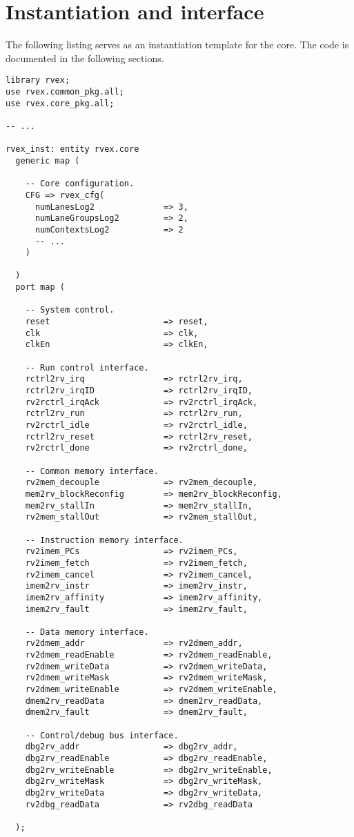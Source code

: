 \documentclass[main.tex]{subfiles}
\begin{document}
\section{Instantiation and interface}

The following listing serves as an instantiation template for the core. The code is documented in the following sections.

\begin{lstlisting}[numbers=none]
library rvex;
use rvex.common_pkg.all;
use rvex.core_pkg.all;

-- ...

rvex_inst: entity rvex.core
  generic map (
    
    -- Core configuration.
    CFG => rvex_cfg(
      numLanesLog2              => 3,
      numLaneGroupsLog2         => 2,
      numContextsLog2           => 2
      -- ...
    )
    
  )
  port map (
    
    -- System control.
    reset                       => reset,
    clk                         => clk,
    clkEn                       => clkEn,
    
    -- Run control interface.
    rctrl2rv_irq                => rctrl2rv_irq,
    rctrl2rv_irqID              => rctrl2rv_irqID,
    rv2rctrl_irqAck             => rv2rctrl_irqAck,
    rctrl2rv_run                => rctrl2rv_run,
    rv2rctrl_idle               => rv2rctrl_idle,
    rctrl2rv_reset              => rctrl2rv_reset,
    rv2rctrl_done               => rv2rctrl_done,
    
    -- Common memory interface.
    rv2mem_decouple             => rv2mem_decouple,
    mem2rv_blockReconfig        => mem2rv_blockReconfig,
    mem2rv_stallIn              => mem2rv_stallIn,
    rv2mem_stallOut             => rv2mem_stallOut,
    
    -- Instruction memory interface.
    rv2imem_PCs                 => rv2imem_PCs,
    rv2imem_fetch               => rv2imem_fetch,
    rv2imem_cancel              => rv2imem_cancel,
    imem2rv_instr               => imem2rv_instr,
    imem2rv_affinity            => imem2rv_affinity,
    imem2rv_fault               => imem2rv_fault,
    
    -- Data memory interface.
    rv2dmem_addr                => rv2dmem_addr,
    rv2dmem_readEnable          => rv2dmem_readEnable,
    rv2dmem_writeData           => rv2dmem_writeData,
    rv2dmem_writeMask           => rv2dmem_writeMask,
    rv2dmem_writeEnable         => rv2dmem_writeEnable,
    dmem2rv_readData            => dmem2rv_readData,
    dmem2rv_fault               => dmem2rv_fault,
    
    -- Control/debug bus interface.
    dbg2rv_addr                 => dbg2rv_addr,
    dbg2rv_readEnable           => dbg2rv_readEnable,
    dbg2rv_writeEnable          => dbg2rv_writeEnable,
    dbg2rv_writeMask            => dbg2rv_writeMask,
    dbg2rv_writeData            => dbg2rv_writeData,
    rv2dbg_readData             => rv2dbg_readData
    
  );

\end{lstlisting}
\end{document}
